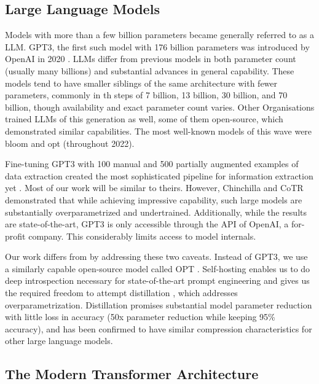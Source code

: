 
\subsection{Large Language Models}\label{sub:llm}
Models with more than a few billion parameters became generally referred to as a \acrlong{LLM}. \gls{GPT3}, the first such model with 176 billion parameters was introduced by \gls{OpenAI} in 2020 \cite{brown_language_2020}.
\glspl{LLM} differ from previous models in both parameter count (usually many billions) and substantial advances in general capability.
These models tend to have smaller siblings of the same architecture with fewer parameters, commonly in th steps of 7 billion, 13 billion, 30 billion, and 70 billion, though availability and exact parameter count varies.
Other Organisations trained \glspl{LLM} of this generation as well, some of them open-source, which demonstrated similar capabilities.
The most well-known models of this wave were \gls{bloom} and \gls{opt} (throughout 2022).

Fine-tuning \gls{GPT3} with 100 manual and 500 partially augmented examples of data extraction
created the most sophisticated pipeline for information extraction yet
\cite{dunn_structured_2022}. Most of our work will be similar to theirs. However,
Chinchilla \cite{hoffmann_training_2022} and CoTR \cite{zhang_multimodal_2023}
demonstrated that while achieving impressive capability, such large models are
substantially overparametrized and undertrained. Additionally, while the
results are state-of-the-art, GPT3 is only accessible through the API of
OpenAI, a for-profit company. This considerably limits access to model
internals.

Our work differs from \cite{dunn_structured_2022} by addressing these two
caveats. Instead of GPT3, we use a similarly capable open-source model called
OPT \cite{zhang_opt_2022}. Self-hosting enables us to do deep introspection
necessary for state-of-the-art prompt engineering and gives us the required
freedom to attempt distillation \cite{sun_patient_2019}, which addresses
overparametrization. Distillation promises substantial model parameter
reduction with little loss in accuracy (50x parameter reduction while keeping
95\% accuracy), and has been confirmed to have similar compression characteristics
for other large language models.

\subsection{The Modern Transformer Architecture}\label{sub:modern}

